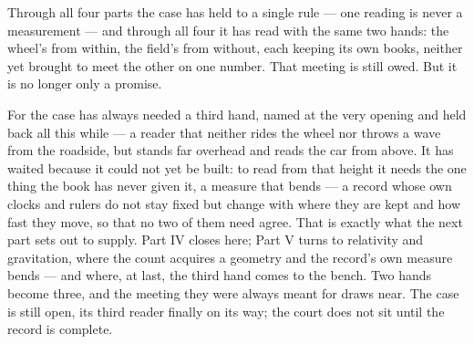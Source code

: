 Through all four parts the case has held to a single rule --- one reading is never a measurement --- and through
all four it has read with the same two hands: the wheel's from within, the field's from without, each keeping
its own books, neither yet brought to meet the other on one number. That meeting is still owed. But it is no
longer only a promise.

For the case has always needed a third hand, named at the very opening and held back all this while --- a reader
that neither rides the wheel nor throws a wave from the roadside, but stands far overhead and reads the car from
above. It has waited because it could not yet be built: to read from that height it needs the one thing the book
has never given it, a measure that bends --- a record whose own clocks and rulers do not stay fixed but change
with where they are kept and how fast they move, so that no two of them need agree. That is exactly what the
next part sets out to supply. Part IV closes here; Part V turns to relativity and gravitation, where the count
acquires a geometry and the record's own measure bends --- and where, at last, the third hand comes to the
bench. Two hands become three, and the meeting they were always meant for draws near. The case is still open,
its third reader finally on its way; the court does not sit until the record is complete.

